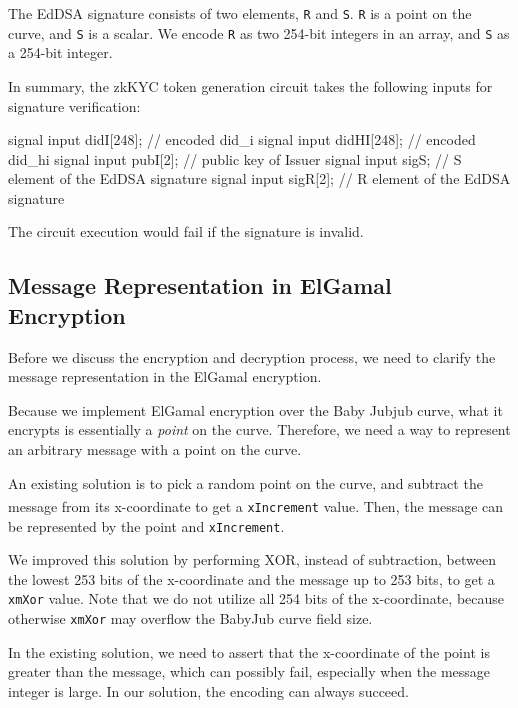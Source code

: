 \documentclass[
]{report}
\newenvironment{Shaded}{}{}
\newcommand{\NormalTok}[1]{#1}
\begin{document}
The EdDSA signature consists of two elements, \texttt{R} and \texttt{S}.
\texttt{R} is a point on the curve, and \texttt{S} is a scalar. We
encode \texttt{R} as two 254-bit integers in an array, and \texttt{S} as
a 254-bit integer.

In summary, the zkKYC token generation circuit takes the following
inputs for signature verification:

\begin{Shaded}
\begin{Highlighting}[]
\NormalTok{signal input didI[248];  // encoded did\_i}
\NormalTok{signal input didHI[248]; // encoded did\_hi}
\NormalTok{signal input pubI[2];    // public key of Issuer}
\NormalTok{signal input sigS;       // S element of the EdDSA signature}
\NormalTok{signal input sigR[2];    // R element of the EdDSA signature}
\end{Highlighting}
\end{Shaded}

The circuit execution would fail if the signature is invalid.

\subsection{Message Representation in ElGamal Encryption}

Before we discuss the encryption and decryption process, we need to
clarify the message representation in the ElGamal encryption.

Because we implement ElGamal encryption over the Baby Jubjub curve, what
it encrypts is essentially a \emph{point} on the curve. Therefore, we
need a way to represent an arbitrary message with a point on the curve.

An existing solution is to pick a random point on the curve, and
subtract the message from its x-coordinate\textsuperscript{\cite{elgamal-circom}}
to get a \texttt{xIncrement} value. Then, the message can be represented
by the point and \texttt{xIncrement}.

We improved this solution by performing XOR, instead of subtraction,
between the lowest 253 bits of the x-coordinate and the message up to
253 bits, to get a \texttt{xmXor} value. Note that we do not utilize all
254 bits of the x-coordinate, because otherwise \texttt{xmXor} may
overflow the BabyJub curve field size.

In the existing solution, we need to assert that the x-coordinate of the
point is greater than the message, which can possibly fail, especially
when the message integer is large. In our solution, the encoding can
always succeed.
\end{document}
